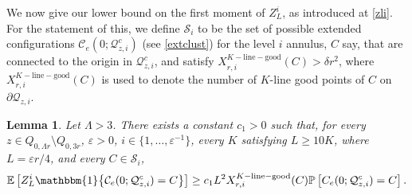 \documentclass[11pt]{article}
\theoremstyle{definition}
\theoremstyle{remark}
\newcommand{\E}{\mathbb{E}}
\newcommand{\bP}{\mathbb{P}}
\numberwithin{equation}{section}
\theoremstyle{plain}
\newtheorem{lem}[theorem]{Lemma}
\theoremstyle{definition}
\theoremstyle{remark}
\theoremstyle{plain}
\newcommand{\ind}[1]{\mathbbm{1}\big\{#1\big\}}
\begin{document}
We now give our lower bound on the first moment of $Z_L^i$, as introduced at \eqref{zli}. For the statement of this, we define $\mathcal S_i$ to be the set of possible extended configurations $\mathcal C_e(0;\mathcal Q^c_{z,i})$ (see \eqref{extclust}) for the level $i$ annulus, $C$ say, that are connected to the origin in $\mathcal Q_{z,i}^c$, and satisfy  $X_{r,i}^{K-\mathrm{line-good}}(C)> \delta r^2$, where $X_{r,i}^{K-\mathrm{line-good}}(C)$ is used to denote the number of $K$-line good points of $C$ on $\partial \mathcal Q_{z,i}$.

\begin{lem}\label{PZlowerbd} Let $\Lambda>3$. There exists a constant $c_1>0$ such that, for every $z \in Q_{0,\Lambda r}\setminus Q_{0,3r}$, $\varepsilon>0$, $i\in\{1,\ldots,\varepsilon^{-1}\}$, every $K$ satisfying $L\ge 10K$, where $L=\varepsilon r/4$, and every $C\in\mathcal S_i$,
\begin{align*}
\E\left[Z_{L}^i\ind{ \mathcal C_e(0; \mathcal Q_{z, i}^c)=C}\right]\ge c_1L^2X_{r,i}^{K-\mathrm{line-good}}(C)\bP\left[C_e(0; \mathcal Q_{z, i}^c)=C\right].
\end{align*}
\end{lem}
\end{document}
